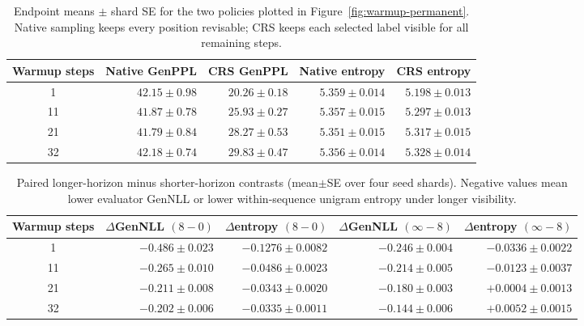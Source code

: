 \documentclass{article}
\newcommand{\1}{\mathbf 1}
\newcommand{\CRS}{\textsc{CRS}}
\theoremstyle{definition}
\begin{document}
\begin{table}[H]
\centering
\footnotesize
\setlength{\tabcolsep}{4.0pt}
\begin{tabular}{@{}crrrr@{}}
\toprule
Warmup steps & Native GenPPL & CRS GenPPL & Native entropy & CRS entropy \\
\midrule
1  & $42.15\pm0.98$ & $20.26\pm0.18$ & $5.359\pm0.014$ & $5.198\pm0.013$ \\
11 & $41.87\pm0.78$ & $25.93\pm0.27$ & $5.357\pm0.015$ & $5.297\pm0.013$ \\
21 & $41.79\pm0.84$ & $28.27\pm0.53$ & $5.351\pm0.015$ & $5.317\pm0.015$ \\
32 & $42.18\pm0.74$ & $29.83\pm0.47$ & $5.356\pm0.014$ & $5.328\pm0.014$ \\
\bottomrule
\end{tabular}
\caption{Endpoint means $\pm$ shard SE for the two policies plotted in
Figure~\ref{fig:warmup-permanent}. Native sampling keeps every position
revisable; \CRS{} keeps each selected label visible for all remaining
steps.}
\label{tab:warmup-permanent-endpoints-app}
\end{table}

\begin{table}[H]
\centering
\footnotesize
\setlength{\tabcolsep}{4.0pt}
\begin{tabular}{@{}crrrr@{}}
\toprule
Warmup steps & $\Delta$GenNLL $(8-0)$ & $\Delta$entropy $(8-0)$ &
$\Delta$GenNLL $(\infty-8)$ & $\Delta$entropy $(\infty-8)$ \\
\midrule
1  & $-0.486\pm0.023$ & $-0.1276\pm0.0082$ & $-0.246\pm0.004$ & $-0.0336\pm0.0022$ \\
11 & $-0.265\pm0.010$ & $-0.0486\pm0.0023$ & $-0.214\pm0.005$ & $-0.0123\pm0.0037$ \\
21 & $-0.211\pm0.008$ & $-0.0343\pm0.0020$ & $-0.180\pm0.003$ & $+0.0004\pm0.0013$ \\
32 & $-0.202\pm0.006$ & $-0.0335\pm0.0011$ & $-0.144\pm0.006$ & $+0.0052\pm0.0015$ \\
\bottomrule
\end{tabular}
\caption{Paired longer-horizon minus shorter-horizon contrasts (mean$\pm$SE
over four seed shards). Negative values mean lower evaluator GenNLL or lower
within-sequence unigram entropy under longer visibility.}
\label{tab:warmup-duration-app}
\end{table}
\end{document}

